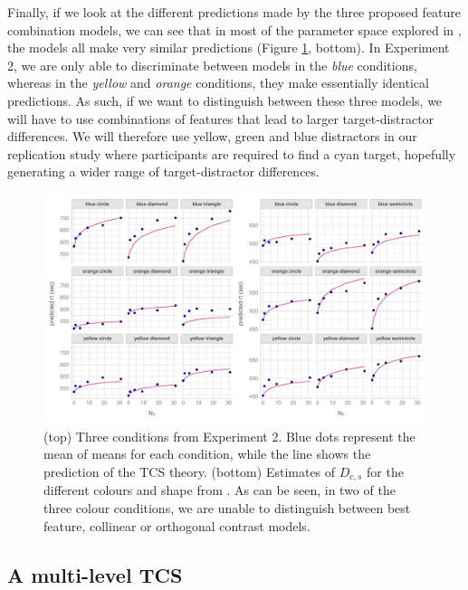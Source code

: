 \documentclass[preprint,12pt,authoryear]{elsarticle}
\begin{document}
Finally, if we look at the different predictions made by the three proposed feature combination models, we can see that in most of the parameter space explored in \cite{buetti2019predicting}, the models all make very similar predictions (Figure \ref{fig:comp_rep_conditions}, bottom). In Experiment 2, we are only able to discriminate between models in the \textit{blue} conditions, whereas in the \textit{yellow} and \textit{orange} conditions, they make essentially identical predictions. As such, if we want to distinguish between these three models, we will have to use combinations of features that lead to larger target-distractor differences. We will therefore use yellow, green and blue distractors in our replication study where participants are required to find a cyan target, hopefully generating a wider range of target-distractor differences.

\begin{figure}
\centering
\includegraphics[width=\textwidth]{../plots/computational_replication_issues.pdf}
\caption{(top) Three conditions from Experiment 2. Blue dots represent the mean of means for each condition, while the line shows the prediction of the TCS theory. (bottom) Estimates of $D_{c,s}$ for the different colours and shape from \cite{buetti2019predicting}. As can be seen, in two of the three colour conditions, we are unable to distinguish between best feature, collinear or orthogonal contrast models.}
\label{fig:comp_rep_conditions}
\end{figure}

\subsection{A multi-level TCS}
\label{sec:reanalysis}
\end{document}
